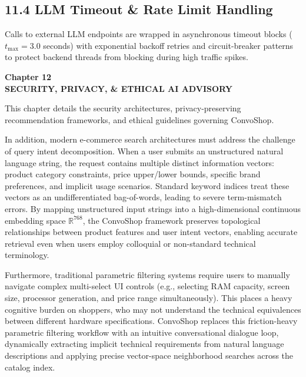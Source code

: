 \documentclass[12pt,a4paper]{article}
\begin{document}
\subsection*{11.4 LLM Timeout \& Rate Limit Handling}
\label{sec:11.4}
Calls to external LLM endpoints are wrapped in asynchronous timeout blocks ($t_{\text{max}} = 3.0$ seconds) with exponential backoff retries and circuit-breaker patterns to protect backend threads from blocking during high traffic spikes.

\newpage

\label{chap:12}
\begin{center}
{\fontsize{14}{17}\bfseries Chapter 12\\[6pt]}
{\fontsize{16}{20}\bfseries SECURITY, PRIVACY, \& ETHICAL AI ADVISORY\\[10pt]}
\end{center}

This chapter details the security architectures, privacy-preserving recommendation frameworks, and ethical guidelines governing ConvoShop.



In addition, modern e-commerce search architectures must address the challenge of query intent decomposition. When a user submits an unstructured natural language string, the request contains multiple distinct information vectors: product category constraints, price upper/lower bounds, specific brand preferences, and implicit usage scenarios. Standard keyword indices treat these vectors as an undifferentiated bag-of-words, leading to severe term-mismatch errors. By mapping unstructured input strings into a high-dimensional continuous embedding space $\mathbb{R}^{768}$, the ConvoShop framework preserves topological relationships between product features and user intent vectors, enabling accurate retrieval even when users employ colloquial or non-standard technical terminology.

Furthermore, traditional parametric filtering systems require users to manually navigate complex multi-select UI controls (e.g., selecting RAM capacity, screen size, processor generation, and price range simultaneously). This places a heavy cognitive burden on shoppers, who may not understand the technical equivalences between different hardware specifications. ConvoShop replaces this friction-heavy parametric filtering workflow with an intuitive conversational dialogue loop, dynamically extracting implicit technical requirements from natural language descriptions and applying precise vector-space neighborhood searches across the catalog index.
\end{document}
